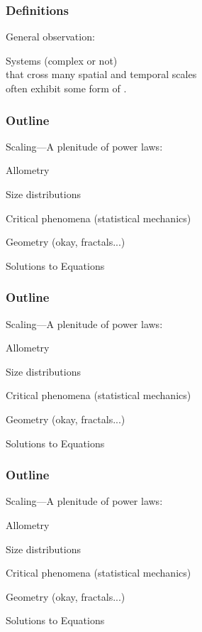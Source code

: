 


\begin{frame}
  \frametitle{Definitions}

General observation:

Systems (complex or not) \\
that cross many spatial and temporal scales\\
often exhibit some form of .

\end{frame}

\begin{frame}
  \frametitle{Outline}

  {Scaling---A plenitude of power laws:}

  \inv

   Allometry

   Size distributions

   Critical phenomena {\small (statistical mechanics)}

   Geometry {\small (okay, fractals...)}

   Solutions to Equations

\end{frame}

\begin{frame}
  \frametitle{Outline}

  {Scaling---A plenitude of power laws:}

   Allometry

  \inv

   Size distributions

   Critical phenomena {\small (statistical mechanics)}

   Geometry {\small (okay, fractals...)}

   Solutions to Equations

\end{frame}

\begin{frame}
  \frametitle{Outline}

  {Scaling---A plenitude of power laws:}

   Allometry

   Size distributions

  \inv

   Critical phenomena {\small (statistical mechanics)}

   Geometry {\small (okay, fractals...)}

   Solutions to Equations

\end{frame}

